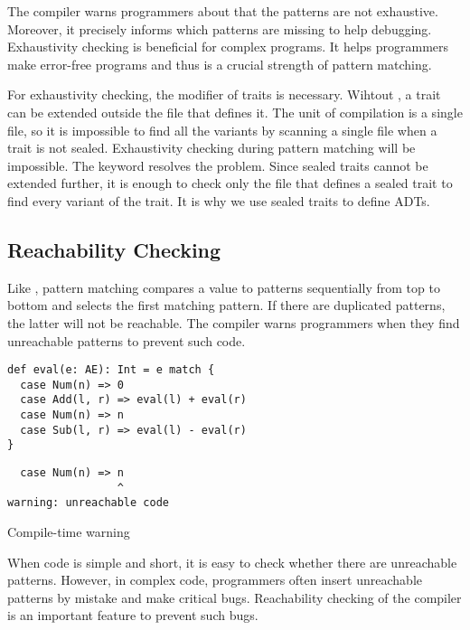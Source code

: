 The compiler warns programmers about that the patterns are not exhaustive. Moreover, it precisely
informs which patterns are missing to help debugging.
Exhaustivity checking is beneficial for complex programs. It helps programmers make
error-free programs and thus is a crucial strength of pattern matching.

For exhaustivity checking, the  modifier of traits is necessary.
Wihtout , a trait can be extended outside the file that defines it.
The unit of compilation is a single file, so it is impossible to find
all the variants by scanning a single file when a trait is not sealed.
Exhaustivity checking during pattern matching will be impossible.
The  keyword resolves the problem. Since sealed traits cannot be
extended further, it is enough to check only the file that defines a sealed trait to find
every variant of the trait. It is why we use sealed traits to define ADTs.

\subsection{Reachability Checking}

Like , pattern
matching compares a value to patterns sequentially from top to bottom and selects
the first matching pattern. If there are duplicated patterns, the latter will
not be reachable.
The compiler warns programmers when they find unreachable patterns to prevent such code.

\begin{verbatim}
def eval(e: AE): Int = e match {
  case Num(n) => 0
  case Add(l, r) => eval(l) + eval(r)
  case Num(n) => n
  case Sub(l, r) => eval(l) - eval(r)
}
\end{verbatim}
\vspace{-1em}
\begin{mdframed}[hidealllines=true,backgroundcolor=gray!10,innerleftmargin=3pt,innerrightmargin=3pt,leftmargin=-3pt,rightmargin=-3pt]
\begin{verbatim}
  case Num(n) => n
                 ^
warning: unreachable code
\end{verbatim}
\vspace{-2em}
\begin{flushright}
\scriptsize\textsf{Compile-time warning}
\end{flushright}
\end{mdframed}

When code is simple and short, it is easy to check whether there are unreachable
patterns. However, in complex code, programmers often insert unreachable
patterns by mistake and make critical bugs. Reachability checking of the
compiler is an important feature to prevent such bugs.

